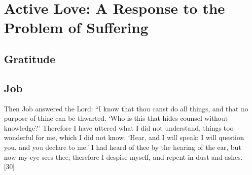 \chapter{Active Love: A Response to the Problem of Suffering}
	\section{Gratitude}
	\section{Job}
Then Job answered the Lord: “I know that thou canst do all things, and that no purpose of thine can be thwarted. ‘Who is this that hides counsel without knowledge?’ Therefore I have uttered what I did not understand, things too wonderful for me, which I did not know. ‘Hear, and I will speak; I will question you, and you declare to me.’ I had heard of thee by the hearing of the ear, but now my eye sees thee; therefore I despise myself, and repent in dust and ashes.[30] 


